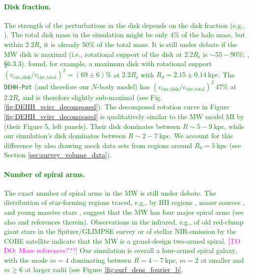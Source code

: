 \documentclass[iop,revtex4,numberedappendix,appendixfloats]{emulateapj}
\newcommand{\Wilma}[1]{\textcolor{Magenta}{#1}}
\newcommand{\NEW}[1]{\textcolor{Green}{#1}}
\begin{document}
\NEW{\paragraph{Disk fraction.} The strength of the perturbations in the disk depends on the disk fraction (e.g., \citealt{2015ApJ...808L...8D}). The total disk mass in the simulation might be only 4\% of the halo mass, but within $2.2R_\text{s}$ it is already 50\% of the total mass. It is still under debate if the MW disk is maximal (i.e., rotational support of the disk at $2.2R_\text{s}$ is $\sim55-90\%$; \citealt{1997ApJ...483..103S, 2008gady.book.....B}, \S 6.3.3). \citet{2013ApJ...779..115B} found, for example, a maximum disk with rotational support $\left( v_\text{circ,disk}/v_\text{circ,total}\right)^2=(69\pm6)\%$ at $2.2R_\text{s}$ with $R_d=2.15\pm0.14~\text{kpc}$. The \texttt{DEHH-Pot} (and therefore our $N$-body model) has  $\left( v_\text{circ,disk}/v_\text{circ,total}\right)^2~47\%$ at $2.2R_\text{s}$ and is therefore slightly sub-maximal (see Fig. \ref{fig:DEHH_vcirc_decomposed}). The decomposed rotation curve in Figure \ref{fig:DEHH_vcirc_decomposed} is qualitatively similar to the MW model MI by \citep{2016A&A...593A.108B} (their Figure 5, left panels). Their disk dominates between $R\sim5-9~\text{kpc}$, while our simulation's disk dominates between $R\sim2-7~\text{kpc}$. We account for this difference by also drawing mock data sets from regions around $R_0=5~\text{kpc}$ (see Section \ref{sec:survey_volume_data}).}

\NEW{\paragraph{Number of spiral arms.}  The exact number of spiral arms in the MW is still under debate. The distribution of star-forming regions traced, e.g., by HII regions \citep{1976A&A....49...57G}, maser sources \citep{2009ApJ...700..137R,2014ApJ...783..130R}, and young massive stars \citep{2014MNRAS.437.1791U}, suggest that the MW has four major spiral arms (see also \citet{2008AJ....135.1301V,2014AJ....148....5V} and references therein). Observations in the infrared, e.g., of old red-clump giant stars  in the Spitzer/GLIMPSE survey \citep{2009PASP..121..213C} or of stellar NIR-emission by the COBE satellite \citep{2001ApJ...556..181D} indicate that the MW is a grand-design two-armed spiral. \Wilma{[TO DO: More references???]} Our simulation is overall a four-armed spiral galaxy, with the mode $m=4$ dominating between $R=4-7~\text{kpc}$, $m=2$ at smaller and $m\geq6$ at larger radii (see Figure \ref{fig:surf_dens_fourier_b}.} 
\end{document}
